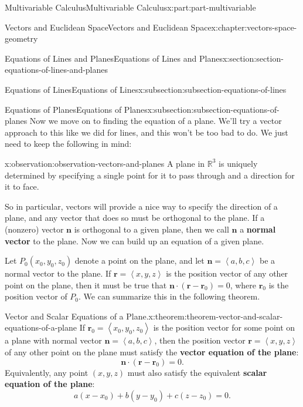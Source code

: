 \documentclass[twoside,10pt,]{book}
\newcommand{\terminology}[1]{\textbf{#1}}
\numberwithin{equation}{part}
\newcommand{\RR}{\mathbb{R}}
\newcommand{\dotprod}[1]{\left\langle #1 \right\rangle}
\begin{document}
\begin{partptx}{Multivariable Calculus}{}{Multivariable Calculus}{}{}{x:part:part-multivariable}
\begin{chapterptx}{Vectors and Euclidean Space}{}{Vectors and Euclidean Space}{}{}{x:chapter:vectors-space-geometry}
\begin{sectionptx}{Equations of Lines and Planes}{}{Equations of Lines and Planes}{}{}{x:section:section-equations-of-lines-and-planes}
\begin{subsectionptx}{Equations of Lines}{}{Equations of Lines}{}{}{x:subsection:subsection-equations-of-lines}
\end{subsectionptx}
%
%
\typeout{************************************************}
\typeout{************************************************}
%
\begin{subsectionptx}{Equations of Planes}{}{Equations of Planes}{}{}{x:subsection:subsection-equations-of-planes}
Now we move on to finding the equation of a plane. We'll try a vector approach to this like we did for lines, and this won't be too bad to do. We just need to keep the following in mind:%
\begin{observation}{}{x:observation:observation-vectors-and-planes}%
A plane in \(\RR^{3}\) is uniquely determined by specifying a single point for it to pass through and a direction for it to face.%
\end{observation}
So in particular, vectors will provide a nice way to specify the direction of a plane, and any vector that does so must be orthogonal to the plane. If a (nonzero) vector \(\mathbf{n}\) is orthogonal to a given plane, then we call \(\mathbf{n}\) a \terminology{normal vector} to the plane. Now we can build up an equation of a given plane.%
\par
Let \(P_{0}(x_{0},y_{0},z_{0})\) denote a point on the plane, and let \(\mathbf{n} = \dotprod{a,b,c}\) be a normal vector to the plane. If \(\mathbf{r}=\dotprod{x,y,z}\) is the position vector of any other point on the plane, then it must be true that \(\mathbf{n}\cdot(\mathbf{r}-\mathbf{r}_{0}) = 0\), where \(\mathbf{r}_{0}\) is the position vector of \(P_{0}\). We can summarize this in the following theorem.%
\begin{theorem}{Vector and Scalar Equations of a Plane.}{}{x:theorem:theorem-vector-and-scalar-equations-of-a-plane}%
%
If \(\mathbf{r}_{0} = \dotprod{x_{0},y_{0},z_{0}}\) is the position vector for some point on a plane with normal vector \(\mathbf{n} = \dotprod{a,b,c}\), then the position vector \(\mathbf{r} = \dotprod{x,y,z}\) of any other point on the plane must satisfy the \terminology{vector equation of the plane}:%
%
\begin{equation*}
\mathbf{n}\cdot(\mathbf{r}-\mathbf{r}_{0}) = 0.
\end{equation*}
Equivalently, any point \((x,y,z)\) must also satisfy the equivalent \terminology{scalar equation of the plane}:%
%
\begin{equation*}
a(x-x_{0})+b(y-y_{0})+c(z-z_{0}) = 0.
\end{equation*}

\end{theorem}
\end{subsectionptx}
\end{sectionptx}
\end{chapterptx}
\end{partptx}
\end{document}
